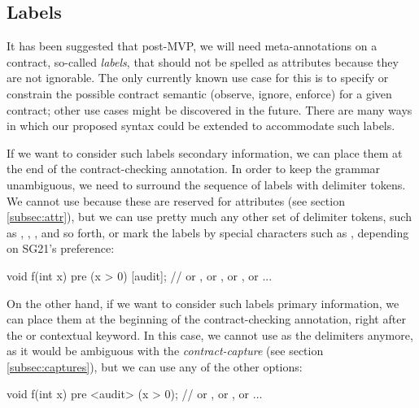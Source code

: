 
\subsection{Labels}
\label{subsec:labels}

It has been suggested that post-MVP, we will need meta-annotations on a contract, so-called \emph{labels}, that should not be spelled as attributes because they are not ignorable. The only currently known use case for this is to specify or constrain the possible contract semantic (observe, ignore, enforce) for a given contract; other use cases might be discovered in the future. There are many ways in which our proposed syntax could be extended to accommodate such labels.

If we want to consider such labels secondary information, we can place them at the end of the contract-checking annotation. In order to keep the grammar unambiguous, we need to surround the sequence of labels with delimiter tokens. We cannot use \tcode{[[ ... ]]} because these are reserved for attributes (see section \ref{subsec:attr}), but we can use pretty much any other set of delimiter tokens, such as \mbox{\tcode{[ ...]}}, \mbox{}, \mbox{}, and so forth, or mark the labels by special characters such as , depending on SG21's preference:

\vspace{2mm}
\begin{codeblock}
void f(int x)
  pre (x > 0) [audit];   // or , or , or \tcode{[\{audit\}]}, or  ...
\end{codeblock}
\vspace{2mm}

On the other hand, if we want to consider such labels primary information, we can place them at the beginning of the contract-checking annotation, right after the  or  contextual keyword. In this case, we cannot use \mbox{\tcode{[...]}} as the delimiters anymore, as it would be ambiguous with the \emph{contract-capture} (see section \ref{subsec:captures}), but we can use any of the other options:

\vspace{2mm}
\begin{codeblock}
void f(int x)
  pre <audit> (x > 0);    // or , or \tcode{[\{audit\}]}, or  ...
\end{codeblock}
\vspace{2mm}

